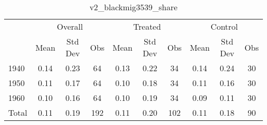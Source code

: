 \begin{table}[htbp]\centering
\def\sym#1{\ifmmode^{#1}\else\(^{#1}\)\fi}
\caption{v2\_blackmig3539\_share \label{tab1}}
\begin{tabular}{l*{3}{ccc}}
\toprule
                    &\multicolumn{3}{c}{Overall}           &\multicolumn{3}{c}{Treated}           &\multicolumn{3}{c}{Control}           \\
                    &        Mean&     Std Dev&         Obs&        Mean&     Std Dev&         Obs&        Mean&     Std Dev&         Obs\\
\midrule
1940                &        0.14&        0.23&          64&        0.13&        0.22&          34&        0.14&        0.24&          30\\
1950                &        0.11&        0.17&          64&        0.10&        0.18&          34&        0.11&        0.16&          30\\
1960                &        0.10&        0.16&          64&        0.10&        0.19&          34&        0.09&        0.11&          30\\
Total               &        0.11&        0.19&         192&        0.11&        0.20&         102&        0.11&        0.18&          90\\
\bottomrule
\end{tabular}
\end{table}
